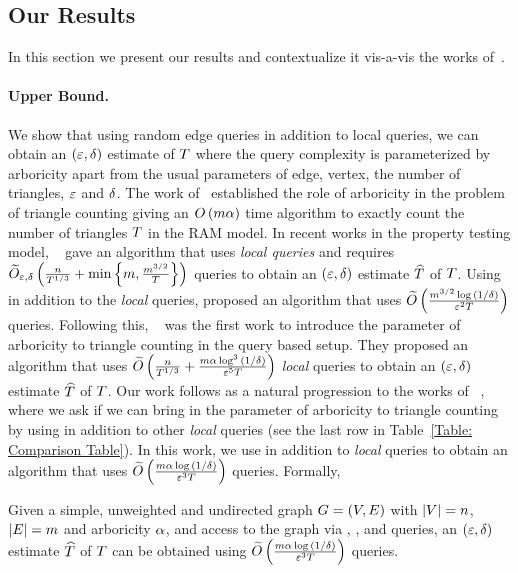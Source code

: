 \subsection{Our Results}
\label{ssec:ourresults}
In this section we present our results and contextualize it vis-a-vis the works of~\cite{assadi2018simple,Dana_Ron_Triangle_Counting,DBLP:conf/soda/EdenRS20,DBLP:conf/approx/AssadiN22}. 
\paragraph*{Upper Bound.}
We show that using random edge queries in addition to local queries, we can obtain an $\left({\varepsilon,\delta}\right)$ estimate of $T$ where the query complexity is parameterized by arboricity apart from the usual parameters of edge, vertex, the number of triangles, $\varepsilon$ and $\delta$. The work of~\citep{DBLP:journals/siamcomp/ChibaN85} established the role of arboricity in the problem of triangle counting giving an $O\left({{m\alpha}}\right)$ time algorithm to exactly count the number of triangles $T$ in the RAM model. In recent works in the property testing model, ~\citep{Dana_Ron_Triangle_Counting} gave an algorithm that uses \emph{local queries} and requires $\widetilde{O}_{\varepsilon,\delta}\left({{\frac{n}{T^{1/3}}+\min{\left\{{m,\frac{m^{3/2}}{T}}\right\}}}}\right)$ queries to obtain an $\left({\varepsilon,\delta}\right)$ estimate $\widehat{T}$ of $T$. Using \randedgeq{} in addition to the \emph{local} queries, \citep{assadi2018simple} proposed an algorithm that uses $\widetilde{O}\left({{\frac{m^{3/2}\log{\left({1/\delta}\right)}}{\varepsilon^2T}}}\right)$ queries. Following this, ~\citep{DBLP:conf/soda/EdenRS20} was the first work to introduce the parameter of arboricity to triangle counting in the query based setup. They proposed an algorithm that uses $\widetilde{O}\left({{\frac{n}{T^{1/3}}+\frac{m\alpha\log^3{\left({1/\delta}\right)}}{\varepsilon^5T}}}\right)$ \emph{local} queries to obtain an $\left({\varepsilon,\delta}\right)$ estimate $\widehat{T}$ of $T$. Our work follows as a natural progression to the works of ~\cite{Dana_Ron_Triangle_Counting,assadi2018simple,DBLP:conf/soda/EdenRS20}, where we ask if we can bring in the parameter of arboricity to triangle counting by using \randedgeq{} in addition to other \emph{local} queries (see the last row in Table~\ref{Table: Comparison Table}).  
In this work, we use \randedgeq{} in addition to \emph{local} queries to obtain an algorithm that uses $\widetilde{O}\left({{\frac{m\alpha\log{\left({1/\delta}\right)}}{\varepsilon^3T}}}\right)$ queries. Formally,
\begin{theorem}\label{Theorem: Upper Bound Simplified}
    Given a simple, unweighted and undirected graph $G = \left({V,E}\right)$ with $\left|{V}\right| = n$, $\left|{E}\right| = m$ and arboricity $\alpha$, and access to the graph via \degreeq{}, \neighbourq{}, \edgeexistsq{} and \randedgeq{} queries, an $\left({\varepsilon,\delta}\right)$ estimate $\widehat{T}$ of $T$ can be obtained using $\widetilde{O}\left({{\frac{m\alpha\log{\left({1/\delta}\right)}}{\varepsilon^3T}}}\right)$ queries.
\end{theorem}

